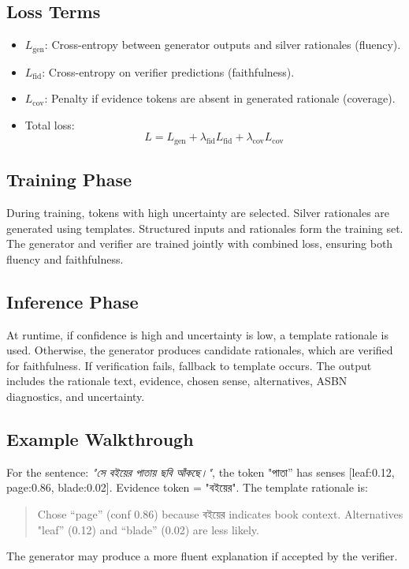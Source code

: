 \documentclass[a4paper,11pt]{article}
\begin{document}
\subsection{Loss Terms}
\begin{itemize}[leftmargin=*]
\item $L_{\text{gen}}$: Cross-entropy between generator outputs and silver rationales (fluency).
\item $L_{\text{fid}}$: Cross-entropy on verifier predictions (faithfulness).
\item $L_{\text{cov}}$: Penalty if evidence tokens are absent in generated rationale (coverage).
\item Total loss:
\[
L = L_{\text{gen}} + \lambda_{\text{fid}} L_{\text{fid}} + \lambda_{\text{cov}} L_{\text{cov}}
\]
\end{itemize}

\subsection{Training Phase}
During training, tokens with high uncertainty are selected. Silver rationales are generated using templates. Structured inputs and rationales form the training set. The generator and verifier are trained jointly with combined loss, ensuring both fluency and faithfulness.

\subsection{Inference Phase}
At runtime, if confidence is high and uncertainty is low, a template rationale is used. Otherwise, the generator produces candidate rationales, which are verified for faithfulness. If verification fails, fallback to template occurs. The output includes the rationale text, evidence, chosen sense, alternatives, ASBN diagnostics, and uncertainty.

\subsection{Example Walkthrough}
For the sentence: \emph{{\bengalifont "সে বইয়ের পাতায় ছবি আঁকছে।"}}, the token {\bengalifont "পাতা''} has senses [leaf:0.12, page:0.86, blade:0.02]. Evidence token = {\bengalifont "বইয়ের"}. The template rationale is:
\begin{quote}
Chose ``page'' (conf 0.86) because {\bengalifont বইয়ের} indicates book context. Alternatives "leaf'' (0.12) and ``blade'' (0.02) are less likely.
\end{quote}
The generator may produce a more fluent explanation if accepted by the verifier.
\end{document}
